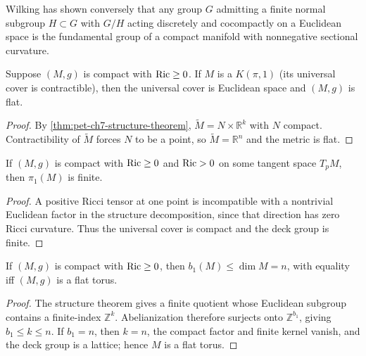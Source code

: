 \begin{remark}
  \label{rem:pet-ch7-wilking-remark}
  Wilking has shown conversely that any group $G$ admitting a finite normal
  subgroup $H\subset G$ with $G/H$ acting discretely and cocompactly on a
  Euclidean space is the fundamental group of a compact manifold with
  nonnegative sectional curvature.
\end{remark}

\begin{corollary}
  \label{cor:pet-ch7-flat-manifold-Kpi1}
  Suppose $(M,g)$ is compact with $\operatorname{Ric}\ge0$. If $M$ is a $K(\pi,1)$ (its
  universal cover is contractible), then the universal cover is Euclidean
  space and $(M,g)$ is flat.
\end{corollary}
\begin{proof}
  \sketch
  By \cref{thm:pet-ch7-structure-theorem}, \(\widetilde M=N\times\mathbb R^k\) with \(N\) compact. Contractibility of \(\widetilde M\) forces \(N\) to be a point, so \(\widetilde M=\mathbb R^n\) and the metric is flat.
\end{proof}

\begin{corollary}
  \label{cor:pet-ch7-finite-fundamental-group-positive-ricci}
  If $(M,g)$ is compact with $\operatorname{Ric}\ge0$ and $\operatorname{Ric}>0$ on some tangent space
  $T_pM$, then $\pi_1(M)$ is finite.
\end{corollary}
\begin{proof}
  \sketch
  A positive Ricci tensor at one point is incompatible with a nontrivial Euclidean factor in the structure decomposition, since that direction has zero Ricci curvature. Thus the universal cover is compact and the deck group is finite.
\end{proof}

\begin{corollary}
  \label{cor:pet-ch7-first-betti-number-bound}
  If $(M,g)$ is compact with $\operatorname{Ric}\ge0$, then $b_1(M)\le\dim M=n$, with
  equality iff $(M,g)$ is a flat torus.
\end{corollary}
\begin{proof}
  \sketch
  The structure theorem gives a finite quotient whose Euclidean subgroup contains a finite-index \(\mathbb Z^k\). Abelianization therefore surjects onto \(\mathbb Z^{b_1}\), giving \(b_1\le k\le n\). If \(b_1=n\), then \(k=n\), the compact factor and finite kernel vanish, and the deck group is a lattice; hence \(M\) is a flat torus.
\end{proof}


